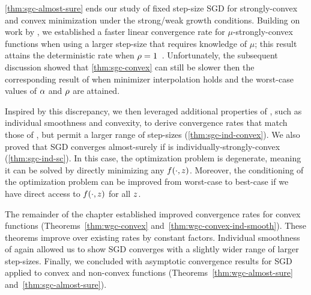 \autoref{thm:sgc-almost-sure} ends our study of fixed step-size \ac{SGD} for strongly-convex and convex minimization under the strong/weak growth conditions.
Building on work by \citet{schmidt2013fast}, we established a faster linear convergence rate for \( \mu \)-strongly-convex functions when using a larger step-size that requires knowledge of \( \mu \);
this result attains the deterministic rate when \( \rho = 1 \)~\citep{bubeck2015convex}. 
Unfortunately, the subsequent discussion showed that \autoref{thm:sgc-convex} can still be slower then the corresponding result of \citet{vaswani2019fast} when minimizer interpolation holds and the worst-case values of \( \alpha \) and \( \rho \) are attained. 

Inspired by this discrepancy, we then leveraged additional properties of \oracle{}, such as individual smoothness and convexity, to derive convergence rates that match those of \citet{vaswani2019fast}, but permit a larger range of step-sizes (\autoref{thm:sgc-ind-convex}). 
We also proved that \ac{SGD} converges almost-surely if \oracle{} is individually-strongly-convex (\autoref{thm:sgc-ind-sc}). 
In this case, the optimization problem is degenerate, meaning it can be solved by directly minimizing any \( f(\cdot, z) \). 
Moreover, the conditioning of the optimization problem can be improved from worst-case to best-case if we have direct access to \( f(\cdot, z) \) for all \( z \).

The remainder of the chapter established improved convergence rates for convex functions (Theorems~\ref{thm:wgc-convex} and~\ref{thm:wgc-convex-ind-smooth}).
These theorems improve over existing rates by constant factors.
Individual smoothness of \oracle{} again allowed us to show \ac{SGD} converges with a slightly wider range of larger step-sizes.
Finally, we concluded with asymptotic convergence results for \ac{SGD} applied to convex and non-convex functions (Theorems~\ref{thm:wgc-almost-sure} and~\ref{thm:sgc-almost-sure}).



\endinput

